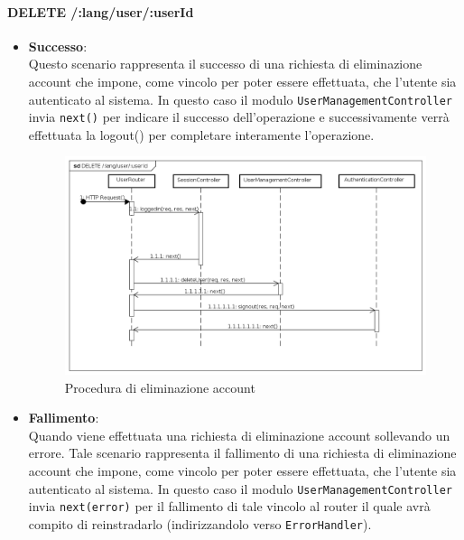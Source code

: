 
\paragraph{DELETE /:lang/user/:userId}
\begin{itemize}
\item \textbf{Successo}: \\
Questo scenario rappresenta il successo di una richiesta di eliminazione account che impone, come vincolo per poter essere effettuata, che l'utente sia autenticato al sistema.  
In questo caso il modulo \texttt{UserManagementController} invia \texttt{next()} per indicare il successo dell'operazione e successivamente verrà effettuata la logout() per completare interamente l'operazione.
\label{Procedura di eliminazione account}
\begin{figure}[ht]
	\centering
	\includegraphics[scale=0.40]{UML/DiagrammiDiSequenza/Back-end/DELETE_LangUserUseridSuccess.png}
	\caption{Procedura di eliminazione account}
\end{figure}
\FloatBarrier

\item \textbf{Fallimento}: \\
Quando viene effettuata una richiesta di eliminazione account sollevando un errore. Tale scenario rappresenta il fallimento di una richiesta di eliminazione account che impone, come vincolo per poter essere effettuata, che l'utente sia autenticato al sistema. In questo caso il modulo \texttt{UserManagementController} invia \texttt{next(error)} per il fallimento di tale vincolo al router il quale avrà compito di reinstradarlo (indirizzandolo verso \texttt{ErrorHandler}).


\end{itemize}
